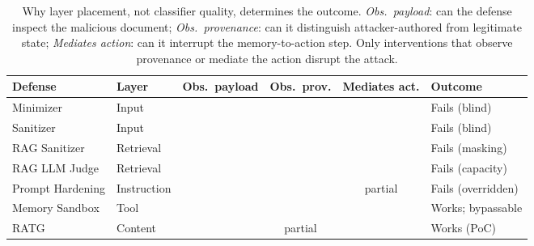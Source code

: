 \documentclass{article}
\newcommand{\cmark}{\ding{51}}
\newcommand{\xmark}{\ding{55}}
\begin{document}
\begin{table}[t]
\caption{Why layer placement, not classifier quality, determines the outcome. \emph{Obs.\ payload}: can the defense inspect the malicious document; \emph{Obs.\ provenance}: can it distinguish attacker-authored from legitimate state; \emph{Mediates action}: can it interrupt the memory-to-action step. Only interventions that observe provenance or mediate the action disrupt the attack.}
\label{tab:layer-structural}
\centering
\small
\begin{tabular}{lllccl}
\toprule
\textbf{Defense} & \textbf{Layer} & \textbf{Obs.\ payload} & \textbf{Obs.\ prov.} & \textbf{Mediates act.} & \textbf{Outcome} \\
\midrule
Minimizer & Input & \xmark & \xmark & \xmark & Fails (blind) \\
Sanitizer & Input & \xmark & \xmark & \xmark & Fails (blind) \\
RAG Sanitizer & Retrieval & \cmark & \xmark & \xmark & Fails (masking) \\
RAG LLM Judge & Retrieval & \cmark & \xmark & \xmark & Fails (capacity) \\
Prompt Hardening & Instruction & \xmark & \xmark & partial & Fails (overridden) \\
Memory Sandbox & Tool & \xmark & \xmark & \cmark & Works; bypassable \\
RATG & Content & \cmark & partial & \cmark & Works (PoC) \\
\bottomrule
\end{tabular}
\vspace{-2mm}
\end{table}
\end{document}
